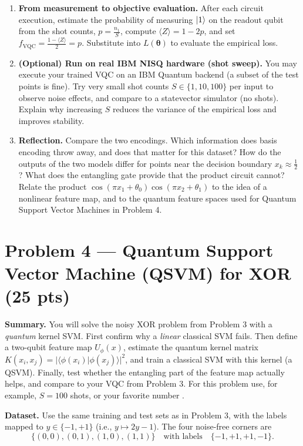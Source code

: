 \documentclass[11pt]{article}
\newenvironment{summary}{\par\noindent\textbf{Summary.} }{\par}
\begin{document}
\begin{enumerate}[label=(\alph*)]
\item \textbf{From measurement to objective evaluation.} After each circuit execution, estimate the probability of measuring $\ket{1}$ on the readout qubit from the shot counts, $p=\tfrac{n_1}{S}$, compute $\langle Z\rangle=1-2p$, and set $f_{\text{VQC}}=\tfrac{1-\langle Z\rangle}{2}=p$. Substitute into $L(\boldsymbol{\theta})$ to evaluate the empirical loss.

\item \textbf{(Optional) Run on real IBM NISQ hardware (shot sweep).} You may execute your trained VQC on an IBM Quantum backend (a subset of the test points is fine). Try very small shot counts $S\in\{1,10,100\}$ per input to observe noise effects, and compare to a statevector simulator (no shots). Explain why increasing $S$ reduces the variance of the empirical loss and improves stability.

\item \textbf{Reflection.} Compare the two encodings. Which information does basis encoding throw away, and does that matter for this dataset? How do the outputs of the two models differ for points near the decision boundary $x_k\approx\tfrac12$? What does the entangling gate provide that the product circuit cannot? Relate the product $\cos(\pi x_1+\theta_0)\cos(\pi x_2+\theta_1)$ to the idea of a nonlinear feature map, and to the quantum feature spaces used for Quantum Support Vector Machines in Problem 4.
\end{enumerate}

\section*{Problem 4 — Quantum Support Vector Machine (QSVM) for XOR (25 pts)}

\begin{summary}
You will solve the noisy XOR problem from Problem 3 with a \emph{quantum} kernel SVM. First confirm why a \emph{linear} classical SVM fails. Then define a two-qubit feature map $U_\phi(x)$, estimate the quantum kernel matrix $K(x_i,x_j)=|\langle \phi(x_i)|\phi(x_j)\rangle|^2$, and train a classical SVM with this kernel (a QSVM). Finally, test whether the entangling part of the feature map actually helps, and compare to your VQC from Problem 3. For this problem use, for example, $S=100$ shots, or your favorite number \smiley{}.
\end{summary}

\noindent\textbf{Dataset.} Use the same training and test sets as in Problem 3, with the labels mapped to $y\in\{-1,+1\}$ (i.e., $y \mapsto 2y-1$). The four noise-free corners are
\[
\{(0,0),(0,1),(1,0),(1,1)\} \quad\text{with labels}\quad \{-1,+1,+1,-1\}.
\]
\end{document}
